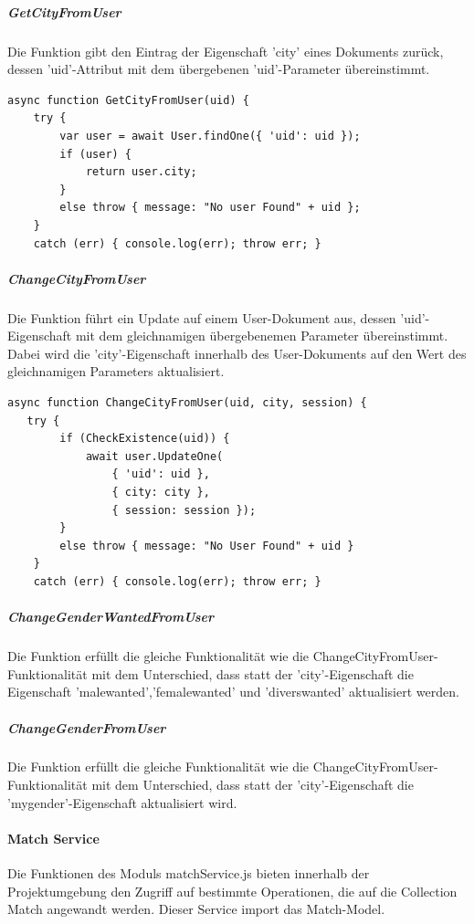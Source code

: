 \subparagraph{GetCityFromUser}
Die Funktion gibt den Eintrag der Eigenschaft 'city' eines Dokuments zurück, dessen 'uid'-Attribut mit dem übergebenen 'uid'-Parameter übereinstimmt.

\begin{lstlisting}[caption=User Service - CheckExistence, label=lst:userservicecheckexistence]
async function GetCityFromUser(uid) {
    try {
        var user = await User.findOne({ 'uid': uid });
        if (user) {
            return user.city;
        }
        else throw { message: "No user Found" + uid };
    }
    catch (err) { console.log(err); throw err; }
\end{lstlisting}

\subparagraph{ChangeCityFromUser}
Die Funktion führt ein Update auf einem User-Dokument aus, dessen 'uid'-Eigenschaft mit dem gleichnamigen übergebenemen Parameter übereinstimmt. Dabei wird die 'city'-Eigenschaft innerhalb des User-Dokuments auf den Wert des gleichnamigen Parameters aktualisiert.

\begin{lstlisting}[caption=User Service - ChangeCityFromUser, label=lst:userservicechangecityfromuser]
async function ChangeCityFromUser(uid, city, session) {  
   try {
        if (CheckExistence(uid)) {
            await user.UpdateOne(
                { 'uid': uid },
                { city: city },
                { session: session });
        }
        else throw { message: "No User Found" + uid }
    }
    catch (err) { console.log(err); throw err; }
\end{lstlisting}

\subparagraph{ChangeGenderWantedFromUser}
Die Funktion erfüllt die gleiche Funktionalität wie die ChangeCityFromUser-Funktionalität mit dem Unterschied, dass statt der 'city'-Eigenschaft die Eigenschaft 'malewanted','femalewanted' und 'diverswanted' aktualisiert werden.

\subparagraph{ChangeGenderFromUser}
Die Funktion erfüllt die gleiche Funktionalität wie die ChangeCityFromUser-Funktionalität mit dem Unterschied, dass statt der 'city'-Eigenschaft die 'mygender'-Eigenschaft aktualisiert wird.


%
%


\paragraph{Match Service}
Die Funktionen des Moduls matchService.js bieten innerhalb der Projektumgebung den Zugriff auf bestimmte Operationen, die auf die Collection Match angewandt werden. Dieser Service import das Match-Model.

